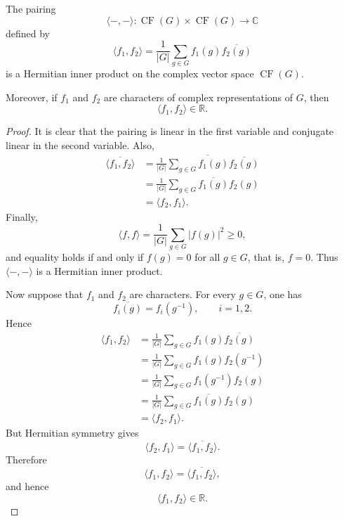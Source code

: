 \begin{proposition}
    The pairing
    \[
        \langle -,-\rangle:
        \operatorname{CF}(G)\times \operatorname{CF}(G)
        \longrightarrow \mathbb{C}
    \]
    defined by
    \[
        \langle f_1,f_2\rangle
        =
        \frac{1}{|G|}
        \sum_{g\in G} f_1(g)\overline{f_2(g)}
    \]
    is a Hermitian inner product on the complex vector space
    \(\operatorname{CF}(G)\).

    Moreover, if \(f_1\) and \(f_2\) are characters of complex representations of
    \(G\), then
    \[
        \langle f_1,f_2\rangle\in \mathbb{R}.
    \]
\end{proposition}

\begin{proof}
    It is clear that the pairing is linear in the first variable and conjugate
    linear in the second variable. Also,
    \[
        \begin{aligned}
            \overline{\langle f_1,f_2\rangle}
             & =
            \overline{
                \frac{1}{|G|}\sum_{g\in G} f_1(g)\overline{f_2(g)}
            }                                    \\
             & =
            \frac{1}{|G|}
            \sum_{g\in G}\overline{f_1(g)}f_2(g) \\
             & =
            \langle f_2,f_1\rangle.
        \end{aligned}
    \]
    Finally,
    \[
        \langle f,f\rangle
        =
        \frac{1}{|G|}
        \sum_{g\in G}|f(g)|^2\geq 0,
    \]
    and equality holds if and only if \(f(g)=0\) for all \(g\in G\), that is,
    \(f=0\). Thus \(\langle -,-\rangle\) is a Hermitian inner product.

    Now suppose that \(f_1\) and \(f_2\) are characters. For every \(g\in G\), one
    has
    \[
        \overline{f_i(g)}=f_i(g^{-1}),
        \qquad i=1,2.
    \]
    Hence
    \[
        \begin{aligned}
            \langle f_1,f_2\rangle
             & =
            \frac{1}{|G|}
            \sum_{g\in G} f_1(g)\overline{f_2(g)} \\
             & =
            \frac{1}{|G|}
            \sum_{g\in G} f_1(g)f_2(g^{-1})       \\
             & =
            \frac{1}{|G|}
            \sum_{g\in G} f_1(g^{-1})f_2(g)       \\
             & =
            \frac{1}{|G|}
            \sum_{g\in G} \overline{f_1(g)}f_2(g) \\
             & =
            \langle f_2,f_1\rangle.
        \end{aligned}
    \]
    But Hermitian symmetry gives
    \[
        \langle f_2,f_1\rangle
        =
        \overline{\langle f_1,f_2\rangle}.
    \]
    Therefore
    \[
        \langle f_1,f_2\rangle
        =
        \overline{\langle f_1,f_2\rangle},
    \]
    and hence
    \[
        \langle f_1,f_2\rangle\in \mathbb{R}.
    \]
\end{proof}

